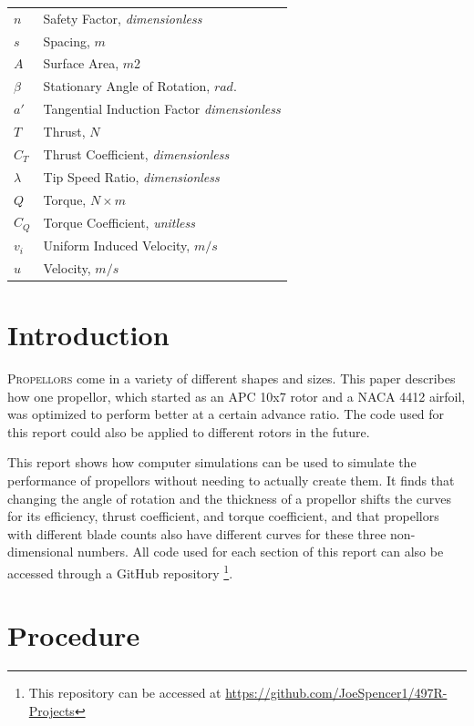 \documentclass[journal ]{new-aiaa}
\begin{document}
{\begin{longtable*}{@{}l @{\quad=\quad} l@{}}
$n$ & Safety Factor, \emph{dimensionless} \\
$s$ & Spacing, $m$ \\
$A$ & Surface Area, $m${2} \\
$\beta$ & Stationary Angle of Rotation, $rad.$ \\
$a'$ & Tangential Induction Factor \emph{dimensionless} \\
$T$ & Thrust, $N$ \\
$C_{T}$ & Thrust Coefficient, \emph{dimensionless} \\
$\lambda$ & Tip Speed Ratio, \emph{dimensionless} \\
$Q$ & Torque, $N \times m$ \\
$C_{Q}$ & Torque Coefficient, \emph{unitless} \\
$v_{i}$ & Uniform Induced Velocity, $m/s$ \\
$u$ & Velocity, $m/s$ \\

\end{longtable*}}


\section{Introduction}

\lettrine{P}{ropellors} come in a variety of different shapes and sizes. This paper describes how one propellor, which started as an APC 10x7 rotor and a NACA 4412 airfoil, was optimized to perform better at a certain advance ratio. The code used for this report could also be applied to different rotors in the future.

This report shows how computer simulations can be used to simulate the performance of propellors without needing to actually create them. It finds that changing the angle of rotation and the thickness of a propellor shifts the curves for its efficiency, thrust coefficient, and torque coefficient, and that propellors with different blade counts also have different curves for these three non-dimensional numbers. All code used for each section of this report can also be accessed through a GitHub repository \footnote{This repository can be accessed at \url{https://github.com/JoeSpencer1/497R-Projects}}.


\section{Procedure}
\end{document}
